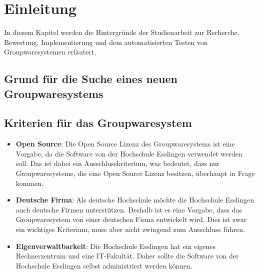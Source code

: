 \chapter{Einleitung}

In diesem Kapitel werden die Hintergründe der Studienarbeit zur Recherche, Bewertung, Implementierung und dem automatisierten Testen von Groupwaresystemen erläutert.

\section{Grund für die Suche eines neuen Groupwaresystems}

\section{Kriterien für das Groupwaresystem}%
\begin{itemize}
    \item \textbf{Open Source}: 
    Die Open Source Lizenz des Groupwaresystems ist eine Vorgabe, da die Software von der Hochschule Esslingen verwendet werden soll.
    Das ist dabei ein Ausschlusskriterium, was bedeutet, dass nur Groupwaresysteme, die eine Open Source Lizenz besitzen, überhaupt in Frage kommen.
    \item \textbf{Deutsche Firma}:
    Als deutsche Hochschule möchte die Hochschule Esslingen auch deutsche Firmen unterstützen.
    Deshalb ist es eine Vorgabe, dass das Groupwaresystem von einer deutschen Firma entwickelt wird.
    Dies ist zwar ein wichtiges Kriterium, muss aber nicht zwingend zum Ausschluss führen.
    \item \textbf{Eigenverwaltbarkeit}:
    Die Hochschule Esslingen hat ein eigenes Rechnerzentrum und eine IT-Fakultät.
    Daher sollte die Software von der Hochschule Esslingen selbst administriert werden können.
\end{itemize}
